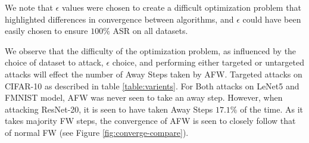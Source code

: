 \documentclass{article}
\begin{document}
\begin{table}[H]
    \centering
    \caption{Attack Success Rate (ASR) and Average Iterations of Frank-Wolfe Algorithm and Variants for Targeted Adversarial Attacks on 500 Examples from Three Datasets with $20$ maximum iterations and decaying step-size rule.}
	\label{table:varients}
\end{table}
We note that $\epsilon$ values were chosen to create a difficult optimization problem that highlighted differences in convergence between algorithms, and $\epsilon$ could have been easily chosen to ensure $100\%$ ASR on all datasets.

We observe that the difficulty of the optimization problem, as influenced by the choice of dataset to attack, $\epsilon$ choice, and performing either targeted or untargeted attacks will effect the number of Away Steps taken by AFW. Targeted attacks on CIFAR-10 as described in table \ref{table:varients}. For Both attacks on LeNet5 and FMNIST model, AFW was never seen to take an away step. However, when attacking ResNet-20, it is seen to have taken Away Steps $17.1\%$ of the time. As it takes majority FW steps, the convergence of AFW is seen to closely follow that of normal FW (see Figure \ref{fig:converge-compare}).
\end{document}
